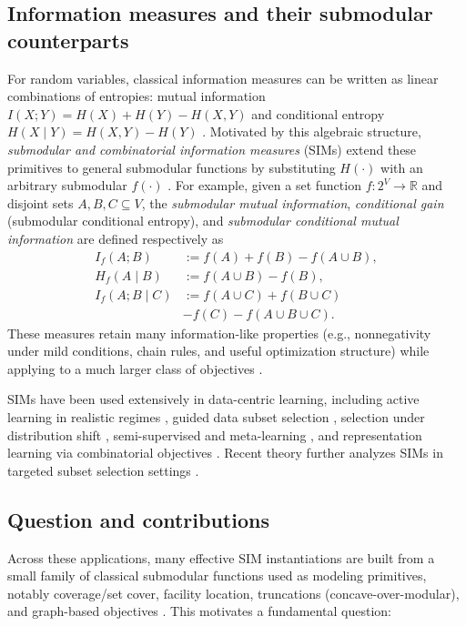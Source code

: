 \documentclass[conference]{IEEEtran}
\theoremstyle{definition}
\theoremstyle{remark}
\begin{document}
\subsection{Information measures and their submodular counterparts}
For random variables, classical information measures can be written as linear combinations of entropies:
mutual information $I(X;Y)=H(X)+H(Y)-H(X,Y)$ and conditional entropy
$H(X\mid Y)=H(X,Y)-H(Y)$ \cite{Shannon1948,Yeung2008}.
Motivated by this algebraic structure, \emph{submodular and combinatorial information measures} (SIMs)
extend these primitives to general submodular functions by substituting $H(\cdot)$ with an arbitrary submodular
$f(\cdot)$ \cite{iyer2021generalized,iyer2021submodular,asnani2021independence}.
For example, given a set function $f:2^V\to \mathbb{R}$ and disjoint sets $A,B,C\subseteq V$, the
\emph{submodular mutual information}, \emph{conditional gain} (submodular conditional entropy), and
\emph{submodular conditional mutual information} are defined respectively as
\begin{align}
I_f(A;B) &:= f(A)+f(B)-f(A\cup B), \label{eq:smi_def}\\
H_f(A\mid B) &:= f(A\cup B)-f(B), \label{eq:cond_gain_def}\\
I_f(A;B\mid C) &:= f(A\cup C)+f(B\cup C) \nonumber \\
                &-f(C)-f(A\cup B\cup C). \label{eq:scmi_def}
\end{align}
These measures retain many information-like properties (e.g., nonnegativity under mild conditions, chain rules,
and useful optimization structure) while applying to a much larger class of objectives
\cite{iyer2021generalized,asnani2021independence}.

SIMs have been used extensively in data-centric learning, including active learning in realistic regimes
\cite{kothawade2021similar, kothawade2022talisman}, guided data subset selection \cite{kothawade2022prism}, selection under distribution shift
\cite{karanam2022orient}, semi-supervised and meta-learning \cite{li2022platinum}, and representation learning via
combinatorial objectives \cite{majee2024score, majee2024smile}. Recent theory further analyzes SIMs in targeted subset selection settings
\cite{beck2024theoretical}.

\subsection{Question and contributions}
Across these applications, many effective SIM instantiations are built from a small family of classical submodular
functions used as modeling primitives, notably coverage/set cover, facility location, truncations (concave-over-modular),
and graph-based objectives \cite{Edmonds1970,Fujishige2005,Schrijver2003}.
This motivates a fundamental question:
\end{document}
